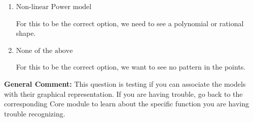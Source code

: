 \documentclass{extbook}[14pt]
\begin{document}
\begin{enumerate}
{\begin{enumerate}[label=\Alph*.]
For this to be the correct option, we want a rapid change early, then an extremely slow change later.
\item \( \text{Non-linear Power model} \)

For this to be the correct option, we need to see a polynomial or rational shape.
\item \( \text{None of the above} \)

For this to be the correct option, we want to see no pattern in the points.
\end{enumerate}

\textbf{General Comment:} This question is testing if you can associate the models with their graphical representation. If you are having trouble, go back to the corresponding Core module to learn about the specific function you are having trouble recognizing.
}
\end{enumerate}
\end{document}
